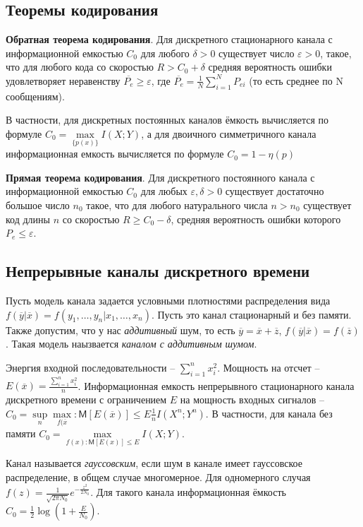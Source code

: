 \documentclass[a4paper,12pt]{article}
\newcommand{\MExpect}{\mathsf{M}}
\begin{document}
\begin{enumerate}
\subsection*{Теоремы кодирования}

\textbf{Обратная теорема кодирования}. Для дискретного стационарного канала с информационной емкостью $C_0$ для любого $\delta>0$ существует число $\varepsilon > 0$, такое, что для любого кода со скоростью $R>C_0+\delta$ средняя вероятность ошибки удовлетворяет неравенству $\overline{P_e}\ge\varepsilon$, где $\overline{P_e}=\frac{1}{N}\sum\limits_{i=1}^{N}P_{ei}$ (то есть среднее по N сообщениям).

В частности, для дискретных постоянных каналов ёмкость вычисляется по формуле $C_0=\max\limits_{\{p(x)\}}I(X;Y)$, а для двоичного симметричного канала информационная емкость вычисляется по формуле $C_0=1-\eta(p)$

\textbf{Прямая теорема кодирования}. Для дискретного постоянного канала с информационной емкостью $C_0$ для любых $\varepsilon,\delta>0$ существует достаточно большое число $n_0$ такое, что для любого натурального числа $n>n_0$ существует код длины $n$ со скоростью $R\ge C_0-\delta$, средняя вероятность ошибки которого $P_e\le\varepsilon$.

\subsection*{Непрерывные каналы дискретного времени}

Пусть модель канала задается условными плотностями распределения вида $f(\overline y|\overline x)=f(y_1,\dots,y_n|x_1,\dots,x_n)$. Пусть это канал стационарный и без памяти. Также допустим, что у нас \textit{аддитивный} шум, то есть $\overline y = \overline x + \overline z$, $f(\overline y|\overline x)=f(\overline z)$. Такая модель наызвается \textit{каналом с аддитивным шумом}.

Энергия входной последовательности -- $\sum\limits_{i=1}^{n}x_i^2$. Мощность на отсчет -- $E(\overline x)=\frac{\sum\limits_{i=1}^{n}x_i^2}{n}$. Информационная емкость непрерывного стационарного канала дискретного времени с ограничением $E$ на мощность входных сигналов -- $C_0=\sup\limits_n\max\limits_{f(\overline x}:\MExpect [E(\overline x)]\le E\frac{1}{n}I(X^n;Y^n)$. В частности, для канала без памяти $C_0=\max\limits_{f(x):\MExpect [E(x)]\le E}I(X;Y)$.

Канал называется \textit{гауссовским}, если шум в канале имеет гауссовское распределение, в общем случае многомерное. Для одномерного случая $f(z)=\frac{1}{\sqrt{2\pi N_0}}e^{-\frac{z^2}{2N_0}}$. Для такого канала информационная ёмкость $C_0=\frac{1}{2}\log(1+\frac{E}{N_0})$.

\end{enumerate}
\end{document}
